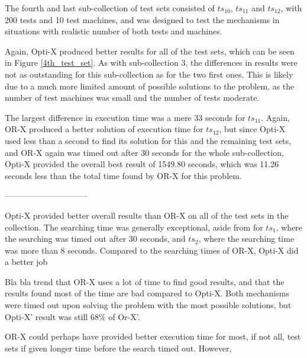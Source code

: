 The fourth and last sub-collection of test sets consisted of $ts_{10}$, $ts_{11}$ and $ts_{12}$, with 200 tests and 10 test machines, and was designed to test the mechanisms in situations with realistic number of both tests and machines.

Again, Opti-X produced better results for all of the test sets, which can be seen in Figure \ref{4th_test_set}. As with sub-collection 3, the differences in results were not as outstanding for this sub-collection as for the two first ones. This is likely due to a much more limited amount of possible solutions to the problem, as the number of test machines was small and the number of tests moderate.

The largest difference in execution time was a mere 33 seconds for $ts_{11}$. Again, OR-X produced a better solution of execution time for $ts_{12}$, but since Opti-X used less than a second to find its solution for this and the remaining test sets, and OR-X again was timed out after 30 seconds for the whole sub-collection, Opti-X provided the overall best result of 1549.80 seconds, which was 11.26 seconds less than the total time found by OR-X for this problem.

\begin{center}------------------------------\end{center}


\noindent Opti-X provided better overall results than OR-X on all of the test sets in the collection. The searching time was generally exceptional, aside from for $ts_1$, where the searching was timed out after 30 seconds, and $ts_2$, where the searching time was more than 8 seconds. Compared to the searching times of OR-X, Opti-X did a better job 

Bla bla trend that OR-X uses a lot of time to find good results, and that the results found most of the time are bad compared to Opti-X. Both mechanisms were timed out upon solving the problem with the most possible solutions, but Opti-X' result was still 68\% of Or-X'.

OR-X could perhaps have provided better execution time for most, if not all, test sets if given longer time before the search timed out. However, 


